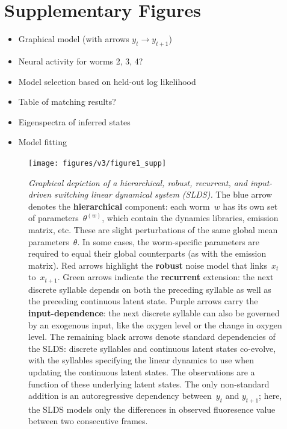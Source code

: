\documentclass[11pt]{article}
\begin{document}
\section{Supplementary Figures}

\begin{itemize}
\item Graphical model (with arrows $y_t \to y_{t+1}$)
\item Neural activity for worms 2, 3, 4?
\item Model selection based on held-out log likelihood
\item Table of matching results?
\item Eigenspectra of inferred states
\item Model fitting 
\end{itemize}


\begin{figure}[t!]
\centering%
\texttt{[image: figures/v3/figure1\_supp]} 
\caption{\textit{Graphical depiction of a hierarchical, robust, recurrent,
    and input-driven switching linear dynamical system (SLDS).}
  The blue arrow denotes the \textbf{hierarchical} component: each worm~$w$ has its
  own set of parameters~$\theta^{(w)}$, which contain the dynamics libraries, emission
  matrix, etc. These are slight perturbations of the same global mean parameters~$\theta$.
  In some cases, the worm-specific parameters are required to equal their global
  counterparts (as with the emission matrix). 
  Red arrows highlight the \textbf{robust} noise model that links~$x_t$ to~$x_{t+1}$.
  Green arrows indicate the \textbf{recurrent} extension: the next discrete syllable depends
  on both the preceding syllable as well as the preceding continuous latent state.
  Purple arrows carry the \textbf{input-dependence}: the next discrete syllable
  can also be governed by an exogenous input, like the oxygen level or the change
  in oxygen level. The remaining black arrows denote standard dependencies
  of the SLDS: discrete syllables and continuous latent states co-evolve, with
  the syllables specifying the linear dynamics to use when updating the continuous
  latent states.  The observations are a function of these underlying latent states.
  The only non-standard addition is an autoregressive dependency between~$y_t$ and
  $y_{t+1}$; here, the SLDS models only the differences in observed fluoresence
  value between two consecutive frames.
}
\label{fig:graphical_model}
\end{figure}
\end{document}
